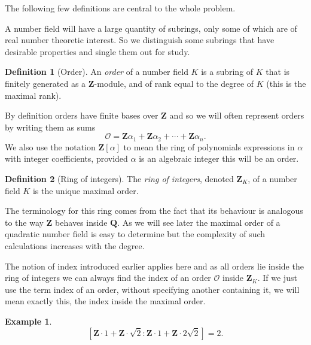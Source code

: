 \documentclass[12pt,a4paper,abstracton,bibtotoc]{scrreprt}
\theoremstyle{definition}
\newtheorem{defn}{Definition}
\newtheorem{ex}{Example}
\newcommand{\QQ}{\mathbf{Q}}
\newcommand{\ZZ}{\mathbf{Z}}
\renewcommand{\O}{\mathcal{O}}
\begin{document}
\minisec{}
The following few definitions are central to the whole problem.

A number field will have a large quantity of subrings, only some of which are of real number theoretic interest.
So we distinguish some subrings that have desirable properties and single them out for study.

\begin{defn}[Order]
An \emph{order} of a number field $K$ is a subring of $K$ that is finitely generated as a $\ZZ$-module, and of rank equal to the degree of $K$ (this is the maximal rank).
\end{defn}

By definition orders have finite bases over $\ZZ$ and so we will often represent orders by writing them as sums 
\[
\O = \ZZ\alpha_1 + \ZZ \alpha_2 + \cdots + \ZZ \alpha_n.
\]
We also use the notation $\ZZ[\alpha]$ to mean the ring of polynomials expressions in $\alpha$ with integer coefficients, provided $\alpha$ is an algebraic integer this will be an order.

\begin{defn}[Ring of integers]
The \emph{ring of integers}, denoted $\ZZ_K$, of a number field $K$ is the unique maximal order.
\end{defn}

The terminology for this ring comes from the fact that its behaviour is analogous to the way $\ZZ$ behaves inside $\QQ$.
As we will see later the maximal order of a quadratic number field is easy to determine but the complexity of such calculations increases with the degree.

The notion of index introduced earlier applies here and as all orders lie inside the ring of integers we can always find the index of an order $\O$ inside $\ZZ_K$.
If we just use the term index of an order, without specifying another containing it, we will mean exactly this, the index inside the maximal order.

\begin{ex}
\[
[\ZZ\cdot 1 + \ZZ\cdot \sqrt{2} : \ZZ \cdot 1 + \ZZ \cdot 2\sqrt{2}] = 2.
\]
\end{ex}
\end{document}
